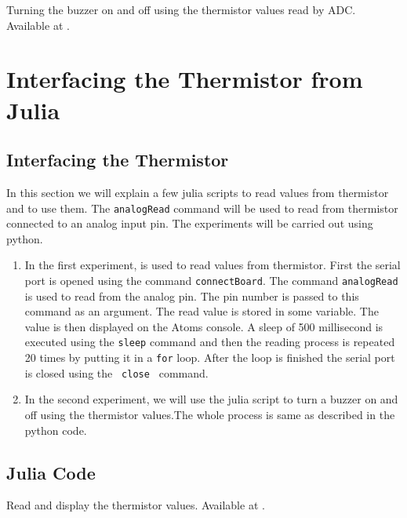 \begin{pycode}
  {Turning the buzzer on and off using the thermistor values read by
    ADC.  Available at .}
\label{py:therm-buzzer}

\end{pycode}

\section{Interfacing the Thermistor from Julia}
\subsection{Interfacing the Thermistor}
In this section we will explain a few julia scripts to read values
from thermistor and to use them.  The {\tt analogRead} command
will be used to read from thermistor connected to an analog input
pin. The experiments will be carried out using python.

\begin{enumerate}
\item In the first experiment,  is used to read
  values from thermistor. First the serial port is opened using the
  command {\tt connectBoard}. The command {\tt analogRead} is used to read from the
  analog pin. The pin number is passed to this command as an
  argument. The read value is stored in some variable. The value is
  then displayed on the Atoms console. A sleep of 500 millisecond is
  executed using the {\tt sleep} command and then the reading process
  is repeated 20 times by putting it in a {\tt for} loop. After the
  loop is finished the serial port is closed using the {\tt
    close } command.

\item In the second experiment, we will use the julia script to
  turn a buzzer on and off using the thermistor values.The whole
  process is same as described in the python code. 
\end{enumerate}

\subsection{Julia Code}
\label{sec:therm-julia-code}

\begin{juliacode}
 {Read and display
    the thermistor values.  Available at
  .}
\label{julia:therm-read}

\end{juliacode}


